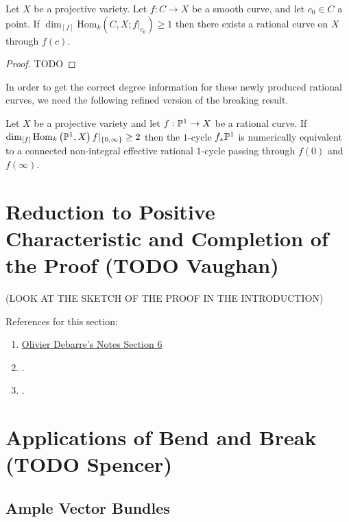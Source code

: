\documentclass[12pt]{article}
\newcommand{\fixHom}[4]{\mathrm{Hom}_{#1} \left( #2, #3 ; #4 \right)}
\begin{document}
\begin{prop}
Let $X$ be a projective variety. Let $f : C \to X$ be a smooth curve, and let $c_0 \in C$ a point. If $\dim_{[f]} \fixHom{k}{C}{X}{f|_{c_0}} \ge 1$ then there exists a rational curve on $X$ through $f(c)$. 
\end{prop}

\begin{proof}
TODO 
\end{proof}

\begin{rmk}
In order to get the correct degree information for these newly produced rational curves, we need the following refined version of the breaking result.
\end{rmk}

\begin{prop}
Let $X$ be a projective variety and let $f : \P^1 \to X$ be a rational curve. If $\dim_{[f]} \Hom{k}{\P^1}{X}{f|_{\{0, \infty\}}} \ge 2$ then the $1$-cycle $f_* \P^1$ is numerically equivalent to a connected non-integral effective rational $1$-cycle passing through $f(0)$ and $f(\infty)$. 
\end{prop}


\section{Reduction to Positive Characteristic and Completion of the Proof (TODO Vaughan)}

(LOOK AT THE SKETCH OF THE PROOF IN THE INTRODUCTION)

\begin{rmk}
References for this section:
\begin{enumerate}
\item \href{https://www.math.ens.psl.eu/~debarre/Grenoble.pdf}{Olivier Debarre's Notes Section 6}
\item \cite[Theorem 1.10]{birational_geometry}.
\item \cite[Section II.5]{rational_curves}.
\end{enumerate}
\end{rmk}


\section{Applications of Bend and Break (TODO Spencer)}

\subsection{Ample Vector Bundles}
\end{document}
